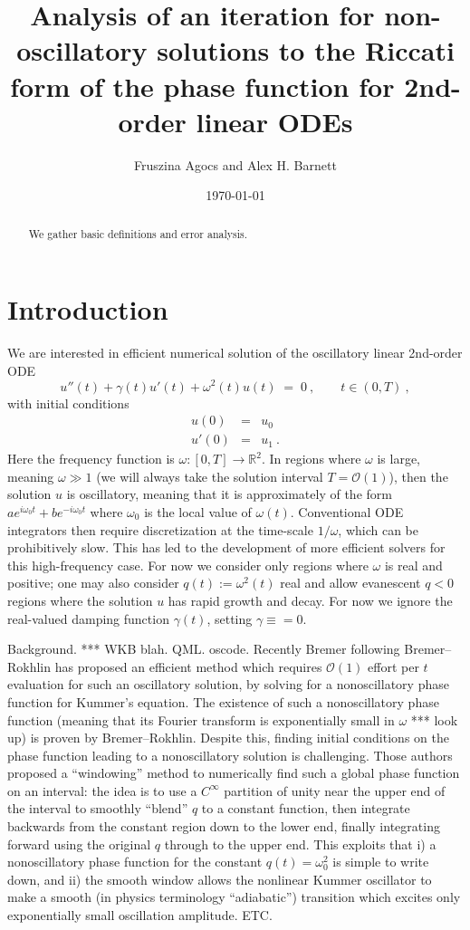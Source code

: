 \documentclass[10pt]{article}
\newcommand{\be}{\begin{equation}}
\newcommand{\ee}{\end{equation}}
\newcommand{\bea}{\begin{eqnarray}}
\newcommand{\eea}{\end{eqnarray}}
\newcommand{\RR}{\mathbb{R}^2}
\newcommand{\bigO}{{\mathcal O}}
\newcommand{\om}{\omega}
\begin{document}
\title{Analysis of an iteration for non-oscillatory solutions to the Riccati form of the phase function for 2nd-order linear ODEs}

\author{Fruszina Agocs and Alex H. Barnett}
\date{\today}
\maketitle

\begin{abstract}
We gather basic definitions and error analysis.
\end{abstract}

\section{Introduction}

We are interested in efficient numerical solution of
the oscillatory linear 2nd-order ODE
\be
u''(t) +\gamma(t) u'(t) + \om^2(t)u(t) \;=\; 0
~,
\qquad t \in (0,T)~,
\label{ode}
\ee
with initial conditions
\bea
u(0) &=& u_0 \\
\label{ic0}
u'(0) &=& u_1~.
\label{ic1}
\eea
Here the frequency function is $\om: [0,T] \to \RR$.
In regions where $\om$ is large, meaning
$\om \gg 1$ (we will always take the solution interval $T=\bigO(1)$),
then the solution $u$ is oscillatory, meaning that
it is approximately of the form $a e^{i\om_0t} + b e^{-i\om_0t}$ where $\om_0$ is the local value of $\om(t)$.
Conventional ODE integrators then require discretization at the
time-scale $1/\om$, which can be prohibitively slow.
This has led to the development of more efficient solvers for this
high-frequency case.
For now we consider only regions where $\om$ is real and positive;
one may also consider $q(t):=\om^2(t)$ real and allow evanescent
$q<0$ regions where the solution $u$ has rapid growth and decay.
For now we ignore the real-valued damping function $\gamma(t)$,
setting $\gamma \equiv =0$.

Background. ***
WKB blah.
QML.
oscode.
Recently Bremer following Bremer--Rokhlin has proposed an efficient
method
which requires $\bigO(1)$ effort per $t$ evaluation for such an
oscillatory solution, by solving for a nonoscillatory
phase function for Kummer's equation.
The existence of such a nonoscillatory phase function
(meaning that its Fourier transform is exponentially small in $\om$ ***
look up) is proven by Bremer--Rokhlin.
Despite this, finding initial conditions on the phase function leading to
a nonoscillatory solution is challenging.
Those authors proposed a
``windowing'' method to numerically find such a global phase function
on an interval:
the idea is to use a $C^\infty$ partition of unity near the upper end of the interval to smoothly ``blend'' $q$ to
a constant function, then integrate backwards from the constant region
down to the lower end,
finally integrating forward using the original $q$ through to the upper end.
This exploits that i) a nonoscillatory phase function for
the constant $q(t) = \om_0^2$ is simple to write down, and
ii) the smooth window allows
the nonlinear Kummer oscillator to make a smooth (in physics
terminology ``adiabatic'') transition which excites
only exponentially small oscillation amplitude.
ETC.
\end{document}
